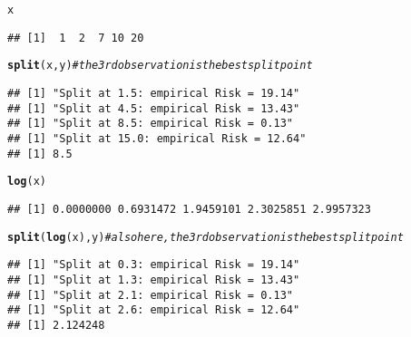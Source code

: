 \documentclass[a4paper]{article}
\makeatletter
\newcommand{\hlcom}[1]{\textcolor[rgb]{0.678,0.584,0.686}{\textit{#1}}}%
\newcommand{\hlstd}[1]{\textcolor[rgb]{0.345,0.345,0.345}{#1}}%
\newcommand{\hlkwd}[1]{\textcolor[rgb]{0.737,0.353,0.396}{\textbf{#1}}}%
\newenvironment{kframe}{%
 \def\at@end@of@kframe{}%
 \ifinner\ifhmode%
  \def\at@end@of@kframe{\end{minipage}}%
  \begin{minipage}{\columnwidth}%
 \fi\fi%
 \def\FrameCommand##1{\hskip\@totalleftmargin \hskip-\fboxsep
 \colorbox{shadecolor}{##1}\hskip-\fboxsep
     \hskip-\linewidth \hskip-\@totalleftmargin \hskip\columnwidth}%
 \MakeFramed {\advance\hsize-\width
   \@totalleftmargin\z@ \linewidth\hsize
   \@setminipage}}%
 {\par\unskip\endMakeFramed%
 \at@end@of@kframe}
\newenvironment{knitrout}{}{} %
\newcounter{aufg}
\makeatother
\begin{document}
{\begin{itemize}
\begin{knitrout}
\begin{kframe}
\begin{alltt}
\hlstd{x}
\end{alltt}
\begin{verbatim}
## [1]  1  2  7 10 20
\end{verbatim}
\begin{alltt}
\hlkwd{split}\hlstd{(x, y)} \hlcom{# the 3rd observation is the best split point}
\end{alltt}
\begin{verbatim}
## [1] "Split at 1.5: empirical Risk = 19.14"
## [1] "Split at 4.5: empirical Risk = 13.43"
## [1] "Split at 8.5: empirical Risk = 0.13"
## [1] "Split at 15.0: empirical Risk = 12.64"
## [1] 8.5
\end{verbatim}
\begin{alltt}
\hlkwd{log}\hlstd{(x)}
\end{alltt}
\begin{verbatim}
## [1] 0.0000000 0.6931472 1.9459101 2.3025851 2.9957323
\end{verbatim}
\begin{alltt}
\hlkwd{split}\hlstd{(}\hlkwd{log}\hlstd{(x), y)} \hlcom{# also here, the 3rd observation is the best split point}
\end{alltt}
\begin{verbatim}
## [1] "Split at 0.3: empirical Risk = 19.14"
## [1] "Split at 1.3: empirical Risk = 13.43"
## [1] "Split at 2.1: empirical Risk = 0.13"
## [1] "Split at 2.6: empirical Risk = 12.64"
## [1] 2.124248
\end{verbatim}
\end{kframe}
\end{knitrout}


\end{itemize}
}

\end{document}
